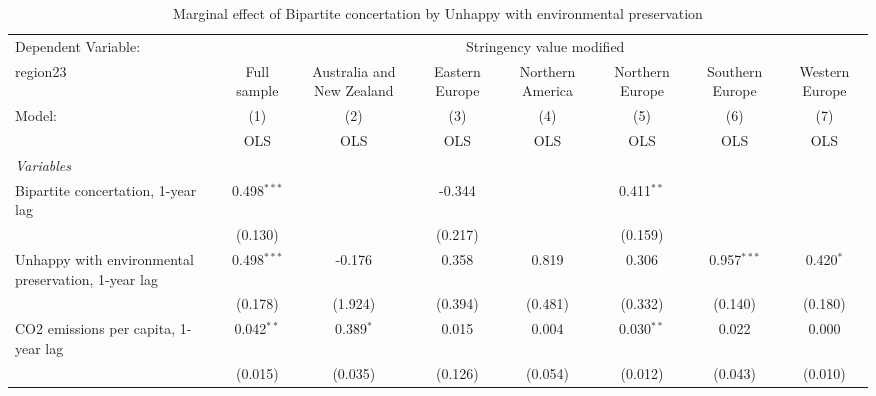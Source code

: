 
\begin{table}[htbp]
   \caption{Marginal effect of Bipartite concertation by Unhappy with environmental preservation}
   \centering
   \begin{tabular}{lccccccc}
      \toprule
      Dependent Variable: & \multicolumn{7}{c}{Stringency value modified}\\
      region23                                                                                 & Full sample    & Australia and New Zealand & Eastern Europe & Northern America & Northern Europe & Southern Europe & Western Europe \\   
      Model:                                                                                   & (1)            & (2)                       & (3)            & (4)              & (5)             & (6)             & (7)\\  
                                                                                               &  OLS           & OLS                       & OLS            & OLS              & OLS             & OLS             & OLS\\  
      \midrule
      \emph{Variables}\\
      Bipartite concertation, 1-year lag                                                       & 0.498$^{***}$  &                           & -0.344         &                  & 0.411$^{**}$    &                 &   \\   
                                                                                               & (0.130)        &                           & (0.217)        &                  & (0.159)         &                 &   \\   
      Unhappy with environmental preservation, 1-year lag                                      & 0.498$^{***}$  & -0.176                    & 0.358          & 0.819            & 0.306           & 0.957$^{***}$   & 0.420$^{*}$\\   
                                                                                               & (0.178)        & (1.924)                   & (0.394)        & (0.481)          & (0.332)         & (0.140)         & (0.180)\\   
      CO2 emissions per capita, 1-year lag                                                     & 0.042$^{**}$   & 0.389$^{*}$               & 0.015          & 0.004            & 0.030$^{**}$    & 0.022           & 0.000\\   
                                                                                               & (0.015)        & (0.035)                   & (0.126)        & (0.054)          & (0.012)         & (0.043)         & (0.010)\\   

\end{tabular}
\end{table}
